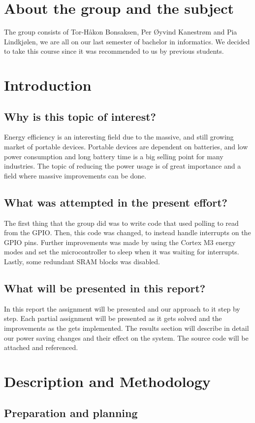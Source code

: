 \section{About the group and the subject}
The group consists of Tor-Håkon Bonsaksen, Per Øyvind Kanestrøm and Pia Lindkjølen, we are all on our last semester of bachelor in informatics. We decided to take this course since it was recommended to us by previous students. 

\section{Introduction}
\subsection{Why is this topic of interest?}
Energy efficiency is an interesting field due to the massive, and still growing market of portable devices. Portable devices are dependent on batteries, and low power consumption and long battery time is a big selling point for many industries. The topic of reducing the power usage is of great importance and a field where massive improvements can be done. 
\subsection{What was attempted in the present effort?}
The first thing that the group did was to write code that used polling to read from the GPIO. Then, this code was changed, to instead handle interrupts on the GPIO pins. Further improvements was made by using the Cortex M3 energy modes and set the microcontroller to sleep when it was waiting for interrupts. Lastly, some redundant SRAM blocks was disabled.   
\subsection{What will be presented in this report?}
In this report the assignment will be presented and our approach to it step by step. Each partial assignment will be presented as it gets solved and the improvements as the gets implemented. The results section will describe in detail our power saving changes and their effect on the system.
The source code will be attached and referenced.

\section{Description and Methodology}
\subsection{Preparation and planning}


